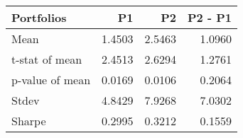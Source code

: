 \begin{tabular}{lrrr}
\toprule
Portfolios & P1 & P2 & P2 - P1 \\
\midrule
Mean & 1.4503 & 2.5463 & 1.0960 \\
t-stat of mean & 2.4513 & 2.6294 & 1.2761 \\
p-value of mean & 0.0169 & 0.0106 & 0.2064 \\
Stdev & 4.8429 & 7.9268 & 7.0302 \\
Sharpe & 0.2995 & 0.3212 & 0.1559 \\
\bottomrule
\end{tabular}
